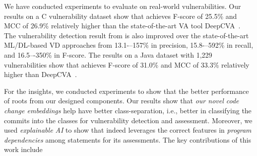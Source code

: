 

We have conducted experiments to evaluate {\tool} on real-world
vulnerabilities. Our results on a C vulnerability dataset
show that {\tool} achieves F-score of 25.5\% and MCC of 26.9\%
relatively higher than the state-of-the-art VA tool
DeepCVA~\cite{deepCVA-ase21}.  The vulnerability detection result from
{\tool} is also improved over the state-of-the-art ML/DL-based VD
approaches from 13.1-–157\% in precision, 15.8-–592\% in recall,
and 16.5–-350\% in F-score.
The results on a Java dataset with 1,229 vulnerabilities show that
{\tool} achieves F-score of 31.0\% and MCC of 33.3\% relatively higher
than DeepCVA~\cite{deepCVA-ase21}.


For the insights, we conducted experiments to show that the better
performance of {\tool} roots from our designed components.
Our results show that {\em our novel code change embeddings} help
{\tool} have better class-separation, i.e., better in classifying the
commits into the classes for vulnerability detection and
assessment. Moreover, we used {\em explainable AI} to show
that {\tool} indeed leverages the correct features in {\em program
  dependencies} among statements for its assessments.
The key contributions of this work include

